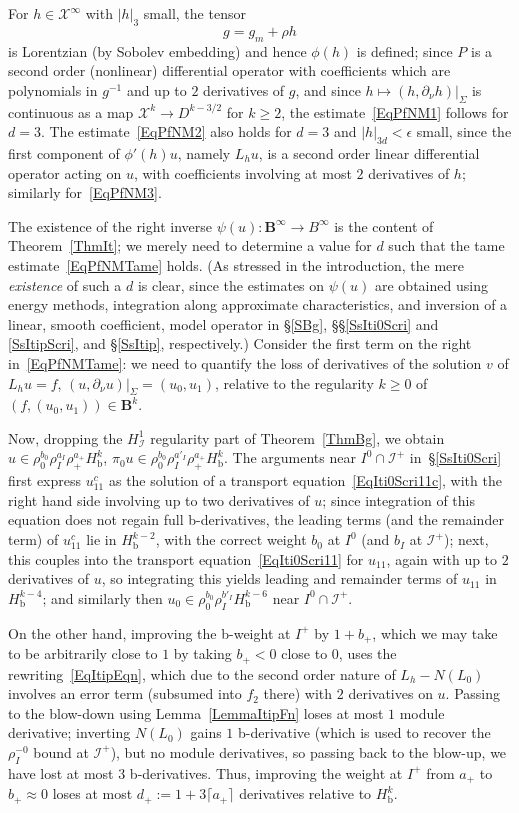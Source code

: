\documentclass[reqno,11pt,letterpaper]{amsart}
\numberwithin{equation}{section}
\numberwithin{figure}{section}
\theoremstyle{definition}
\theoremstyle{remark}
\newcommand{\mc}{\mathcal}
\newcommand{\cX}{\mc X}
\newcommand{\ms}{\mathscr}
\newcommand{\scri}{\ms I}
\newcommand{\bfB}{\mathbf{B}}
\newcommand{\eps}{\epsilon}
\newcommand{\pa}{\partial}
\newcommand{\bop}{{\mathrm{b}}}
\newcommand{\Hb}{H_{\bop}}
\newcommand{\Hscri}{H_{\scri}}
\begin{document}
For $h\in\cX^\infty$ with $|h|_3$ small, the tensor
\[
  g=g_m+\rho h
\]
is Lorentzian (by Sobolev embedding) and hence $\phi(h)$ is defined; since $P$ is a second order (nonlinear) differential operator with coefficients which are polynomials in $g^{-1}$ and up to $2$ derivatives of $g$, and since $h\mapsto(h,\pa_\nu h)|_\Sigma$ is continuous as a map $\cX^k\to D^{k-3/2}$ for $k\geq 2$, the estimate~\eqref{EqPfNM1} follows for $d=3$. The estimate~\eqref{EqPfNM2} also holds for $d=3$ and $|h|_{3 d}<\eps$ small, since the first component of $\phi'(h)u$, namely $L_h u$, is a second order linear differential operator acting on $u$, with coefficients involving at most $2$ derivatives of $h$; similarly for~\eqref{EqPfNM3}.

The existence of the right inverse $\psi(u)\colon\bfB^\infty\to B^\infty$ is the content of Theorem~\ref{ThmIt}; we merely need to determine a value for $d$ such that the tame estimate~\eqref{EqPfNMTame} holds. (As stressed in the introduction, the mere \emph{existence} of such a $d$ is clear, since the estimates on $\psi(u)$ are obtained using energy methods, integration along approximate characteristics, and inversion of a linear, smooth coefficient, model operator in \S\ref{SBg}, \S\S\ref{SsIti0Scri} and \ref{SsItipScri}, and \S\ref{SsItip}, respectively.) Consider the first term on the right in~\eqref{EqPfNMTame}: we need to quantify the loss of derivatives of the solution $v$ of $L_h u=f$, $(u,\pa_\nu u)|_\Sigma=(u_0,u_1)$, relative to the regularity $k\geq 0$ of $(f,(u_0,u_1))\in\bfB^k$.

Now, dropping the $\Hscri^1$ regularity part of Theorem~\ref{ThmBg}, we obtain $u\in\rho_0^{b_0}\rho_I^{a_I}\rho_+^{a_+}\Hb^k$, $\pi_0 u\in\rho_0^{b_0}\rho_I^{a'_I}\rho_+^{a_+}\Hb^k$. The arguments near $I^0\cap\scri^+$ in~\S\ref{SsIti0Scri} first express $u_{1 1}^c$ as the solution of a transport equation~\eqref{EqIti0Scri11c}, with the right hand side involving up to two derivatives of $u$; since integration of this equation does not regain full b-derivatives, the leading terms (and the remainder term) of $u_{1 1}^c$ lie in $\Hb^{k-2}$, with the correct weight $b_0$ at $I^0$ (and $b_I$ at $\scri^+$); next, this couples into the transport equation~\eqref{EqIti0Scri11} for $u_{1 1}$, again with up to $2$ derivatives of $u$, so integrating this yields leading and remainder terms of $u_{1 1}$ in $\Hb^{k-4}$; and similarly then $u_0\in\rho_0^{b_0}\rho_I^{b'_I}\Hb^{k-6}$ near $I^0\cap\scri^+$.

On the other hand, improving the b-weight at $I^+$ by $1+b_+$, which we may take to be arbitrarily close to $1$ by taking $b_+<0$ close to $0$, uses the rewriting~\eqref{EqItipEqn}, which due to the second order nature of $L_h-N(L_0)$ involves an error term (subsumed into $f_2$ there) with $2$ derivatives on $u$. Passing to the blow-down using Lemma~\ref{LemmaItipFn} loses at most $1$ module derivative; inverting $N(L_0)$ gains $1$ b-derivative (which is used to recover the $\rho_I^{-0}$ bound at $\scri^+$), but no module derivatives, so passing back to the blow-up, we have lost at most $3$ b-derivatives. Thus, improving the weight at $I^+$ from $a_+$ to $b_+\approx 0$ loses at most $d_+:=1+3\lceil a_+\rceil$ derivatives relative to $\Hb^k$.
\end{document}
